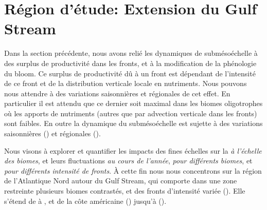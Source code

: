 \begin{figure}
  \centering
  \label{fig:early-bloom-mahadevan}
\end{figure}

\section{Région d'étude: Extension du Gulf Stream}
\label{sec:region-detude}

Dans la section précédente, nous avons relié les dynamiques de submésoéchelle à des surplus de productivité dans les fronts, et à la modification de la phénologie du bloom.
Ce surplus de productivité dû à un front est dépendant de l'intensité de ce front et de la distribution verticale locale en nutriments.
Nous pouvons nous attendre à des variations saisonnières et régionales de cet effet.
En particulier il est attendu que ce dernier soit maximal dans les biomes oligotrophes où les apports de nutriments (autres que par advection verticale dans les fronts) sont faibles.
En outre la dynamique du submésoéchelle est sujette à des variations saisonnières (\cite{callies_2015}) et régionales (\cite{mauzole_2022}).

Nous visons à explorer et quantifier les impacts des fines échelles sur la  \emph{à l'échelle des biomes}, et leurs fluctuations \emph{au cours de l'année}, \emph{pour différents biomes}, et \emph{pour différents intensité de fronts}.
À cette fin nous nous concentrons sur la région de l'Atlantique Nord autour du Gulf Stream, qui comporte dans une zone restreinte plusieurs biomes contrastés, et des fronts d'intensité variée (\cite{bock_2022}).
Elle s'étend de  à , et de la côte américaine () jusqu'à  ().

\begin{figure}
  \centering
  \label{fig:region}
\end{figure}

